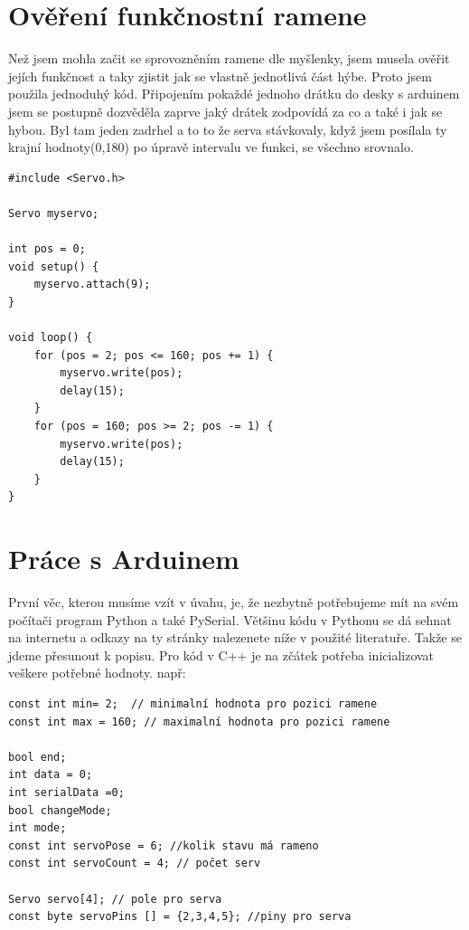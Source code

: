 \documentclass[12pt, a4paper,
twoside,        %
openright
]{report}
\begin{document}
{\newpage

\section{Ověření funkčnostní ramene}
Než jsem mohla začit se sprovozněním ramene dle myšlenky, jsem musela ověřit jejích funkčnost a taky zjistit jak se vlastně jednotlivá část hýbe.
Proto jsem použila jednoduhý kód. Připojením pokaždé jednoho drátku do desky s arduinem jsem se postupně dozvěděla zaprve jaký drátek zodpovídá za co a také i jak se hybou. Byl tam jeden zadrhel a to to že serva stávkovaly, když jsem posílala ty krajní hodnoty(0,180) po úpravě intervalu ve funkci, se všechno srovnalo.

\begin{lstlisting}[style=Python, caption={Ukázka kódu k ověření funkčnosti}]
#include <Servo.h>

Servo myservo;  

int pos = 0;    
void setup() {
	myservo.attach(9);  
}

void loop() {
	for (pos = 2; pos <= 160; pos += 1) { 
		myservo.write(pos);             
		delay(15);                      
	}
	for (pos = 160; pos >= 2; pos -= 1) {
		myservo.write(pos);            
		delay(15);                       
	}
}
\end{lstlisting}

\newpage

\section{Práce s Arduinem}

První věc, kterou musíme vzít v úvahu, je, že nezbytně potřebujeme mít na svém počítači program Python a také PySerial. Většinu kódu v Pythonu se dá sehnat na internetu a odkazy na ty stránky nalezenete níže v použité literatuře. 
Takže se jdeme přesunout k popisu.
Pro kód v C++ je na zčátek potřeba inicializovat veškere potřebné hodnoty.
např:

\begin{lstlisting}[style=Python, caption={Inicializace potřebných hodnot}]
const int min= 2;  // minimalní hodnota pro pozici ramene
const int max = 160; // maximalní hodnota pro pozici ramene

bool end;
int data = 0;
int serialData =0;
bool changeMode;
int mode;
const int servoPose = 6; //kolik stavu má rameno
const int servoCount = 4; // počet serv

Servo servo[4]; // pole pro serva 
const byte servoPins [] = {2,3,4,5}; //piny pro serva
\end{lstlisting}


}
\end{document}
